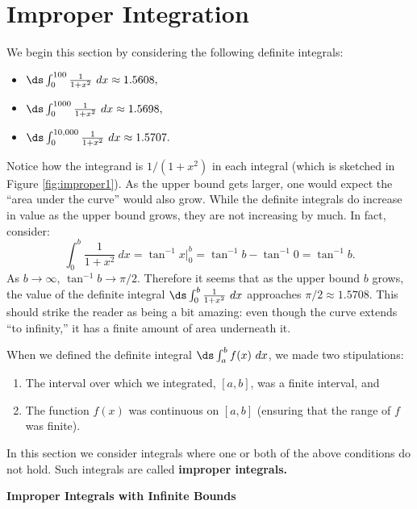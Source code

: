 \section{Improper Integration}\label{sec:improper_integration}

We begin this section by considering the following definite integrals:
\begin{itemize}
\item	$\ds \int_0^{100}\frac1{1+x^2}\ dx \approx 1.5608,$
\item	$\ds \int_0^{1000}\frac1{1+x^2}\ dx \approx 1.5698,$
\item	$\ds \int_0^{10,000}\frac1{1+x^2}\ dx \approx 1.5707.$
\end{itemize}

Notice how the integrand is $1/(1+x^2)$ in each integral (which is sketched in Figure \ref{fig:improper1}). As the upper bound gets larger, one would expect the ``area under the curve'' would also grow. While the definite integrals do increase in value as the upper bound grows, they are not  increasing by much. In fact, consider:
$$\int_0^b \frac{1}{1+x^2}\ dx = \tan^{-1}x\Big|_0^b = \tan^{-1}b-\tan^{-1}0 = \tan^{-1}b.$$
As $b\rightarrow \infty$, $\tan^{-1}b \rightarrow \pi/2.$ Therefore it seems that as the upper bound $b$ grows, the value of the definite integral $\ds \int_0^b\frac{1}{1+x^2}\ dx$ approaches $\pi/2\approx 1.5708$. This should strike the reader as being a bit amazing: even though the curve extends ``to infinity,'' it has a finite amount of area underneath it.


When we defined the definite integral $\ds\int_a^b f(x)\ dx$, we made two stipulations:
	\begin{enumerate}
	\item		The interval over which we integrated, $[a,b]$, was a finite interval, and
	\item		The function $f(x)$ was continuous on $[a,b]$ (ensuring that the range of $f$ was finite).
	\end{enumerate}
	
In this section we consider integrals where one or both of the above conditions do not hold. Such integrals are called \textbf{improper integrals.}
\clearpage

\noindent\textbf{\large Improper Integrals with Infinite Bounds}

